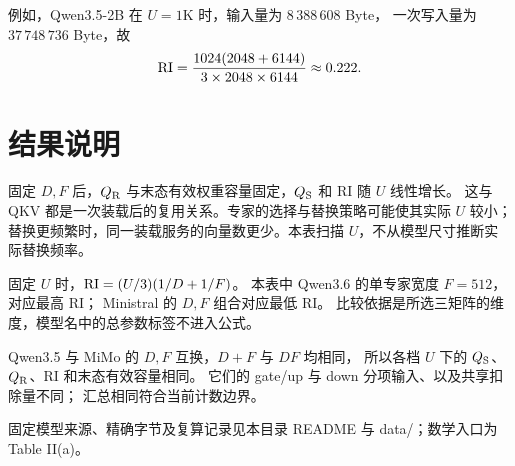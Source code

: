 例如，Qwen3.5-2B 在 $U=1\mathrm{K}$ 时，输入量为 $8\,388\,608$ Byte，
一次写入量为 $37\,748\,736$ Byte，故
\[
 \mathrm{RI}=\frac{1024(2048+6144)}{3\times2048\times6144}\approx0.222.
\]

\section{结果说明}
固定 $D,F$ 后，$Q_{\mathrm R}$ 与末态有效权重容量固定，$Q_{\mathrm S}$ 和 RI 随 $U$ 线性增长。
这与 QKV 都是一次装载后的复用关系。专家的选择与替换策略可能使其实际 $U$ 较小；
替换更频繁时，同一装载服务的向量数更少。本表扫描 $U$，不从模型尺寸推断实际替换频率。

固定 $U$ 时，$\mathrm{RI}=(U/3)(1/D+1/F)$。
本表中 Qwen3.6 的单专家宽度 $F=512$，对应最高 RI；
Ministral 的 $D,F$ 组合对应最低 RI。
比较依据是所选三矩阵的维度，模型名中的总参数标签不进入公式。

Qwen3.5 与 MiMo 的 $D,F$ 互换，$D+F$ 与 $DF$ 均相同，
所以各档 $U$ 下的 $Q_{\mathrm S}$、$Q_{\mathrm R}$、RI 和末态有效容量相同。
它们的 gate/up 与 down 分项输入、以及共享扣除量不同；
汇总相同符合当前计数边界。

\par\smallskip\noindent\small
固定模型来源、精确字节及复算记录见本目录 README 与 data/；数学入口为 Table II(a)。

